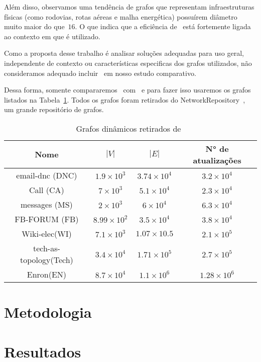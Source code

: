 Além disso, observamos uma tendência de grafos que representam infraestruturas físicas (como rodovias, rotas aéreas e malha energética) possuírem diâmetro muito maior do que~$16$.
O que indica que a eficiência de~\CLHB{} está fortemente ligada ao contexto em que é utilizado. 

Como a proposta desse trabalho é analisar soluções adequadas para uso geral, independente de contexto ou características especificas dos grafos utilizados, não consideramos adequado incluir~\CLHB{} em nosso estudo comparativo.


Dessa forma, somente compararemos~\HK{} com~\HDT{} e para fazer isso usaremos os grafos listados na Tabela~\ref{tab:datasets}.
Todos os grafos foram retirados do NetworkRepository~\cite{nr-aaai15}, um grande repositório de grafos.


\begin{table}
\begin{center}
\begin{tabular}{ |c|c|c|c| } 
 \hline
	Nome & $|V|$ & $|E|$ & N° de atualizações\\
 \hline
	email-dnc (DNC)&$1.9\times 10^3$&$3.74\times 10^4$&$3.2\times 10^4$\\
 \hline
	Call (CA)&$7\times 10^3$&$5.1\times 10^4$&$2.3\times 10^4$\\
 \hline
	messages (MS)&$2\times 10^3$&$6\times 10^4$&$6.3\times 10^4$\\
 \hline
	FB-FORUM (FB)&$8.99\times 10^2$&$3.5\times 10^4$&$3.8\times 10^4$\\
 \hline
	Wiki-elec(WI)&$7.1\times 10^3$&$1.07\times 10.5$&$2.1\times 10^5$\\
 \hline
	tech-as-topology(Tech)&$3.4\times 10^4$&$1.71\times 10^5$&$2.7\times 10^5$\\
 \hline
	Enron(EN)&$8.7\times 10^4$&$1.1\times 10^6$&$1.28\times 10^6$\\
 \hline
\end{tabular}
\caption{Grafos dinâmicos retirados de~\cite{nr-aaai15}}
\label{tab:datasets}
\end{center}
\end{table}


\section{Metodologia}

\cite{guideXP1999}

\section{Resultados}

